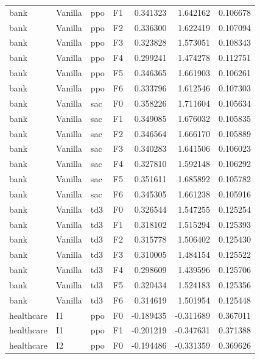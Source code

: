 \begin{tabular}{llllrrr}
      bank & Vanilla &       ppo &  F1 &  0.341323 &  1.642162 &  0.106678 \\
      bank & Vanilla &       ppo &  F2 &  0.336300 &  1.622419 &  0.107094 \\
      bank & Vanilla &       ppo &  F3 &  0.323828 &  1.573051 &  0.108343 \\
      bank & Vanilla &       ppo &  F4 &  0.299241 &  1.474278 &  0.112751 \\
      bank & Vanilla &       ppo &  F5 &  0.346365 &  1.661903 &  0.106261 \\
      bank & Vanilla &       ppo &  F6 &  0.333796 &  1.612546 &  0.107303 \\
      bank & Vanilla &       sac &  F0 &  0.358226 &  1.711604 &  0.105634 \\
      bank & Vanilla &       sac &  F1 &  0.349085 &  1.676032 &  0.105835 \\
      bank & Vanilla &       sac &  F2 &  0.346564 &  1.666170 &  0.105889 \\
      bank & Vanilla &       sac &  F3 &  0.340283 &  1.641506 &  0.106023 \\
      bank & Vanilla &       sac &  F4 &  0.327810 &  1.592148 &  0.106292 \\
      bank & Vanilla &       sac &  F5 &  0.351611 &  1.685892 &  0.105782 \\
      bank & Vanilla &       sac &  F6 &  0.345305 &  1.661238 &  0.105916 \\
      bank & Vanilla &       td3 &  F0 &  0.326544 &  1.547255 &  0.125254 \\
      bank & Vanilla &       td3 &  F1 &  0.318102 &  1.515294 &  0.125393 \\
      bank & Vanilla &       td3 &  F2 &  0.315778 &  1.506402 &  0.125430 \\
      bank & Vanilla &       td3 &  F3 &  0.310005 &  1.484154 &  0.125522 \\
      bank & Vanilla &       td3 &  F4 &  0.298609 &  1.439596 &  0.125706 \\
      bank & Vanilla &       td3 &  F5 &  0.320434 &  1.524183 &  0.125356 \\
      bank & Vanilla &       td3 &  F6 &  0.314619 &  1.501954 &  0.125448 \\
healthcare &      I1 &       ppo &  F0 & -0.189435 & -0.311689 &  0.367011 \\
healthcare &      I1 &       ppo &  F1 & -0.201219 & -0.347631 &  0.371388 \\
healthcare &      I2 &       ppo &  F0 & -0.194486 & -0.331359 &  0.369626 \\

\end{tabular}
